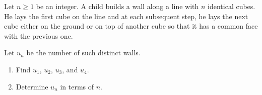 \documentclass[varwidth]{standalone}
\begin{document}
    Let $n \geq 1$ be an integer. A child builds a wall along a line with $n$ identical cubes. He lays the first cube on the line and at each subsequent step, he lays the next cube either on the ground or on top of another cube so that it has a common face with the previous one.

    Let $u_n$ be the number of such distinct walls.

    \begin{enumerate}
        \item Find $u_1$, $u_2$, $u_3$, and $u_4$.
        \item Determine $u_n$ in terms of $n$.
    \end{enumerate}
\end{document}
